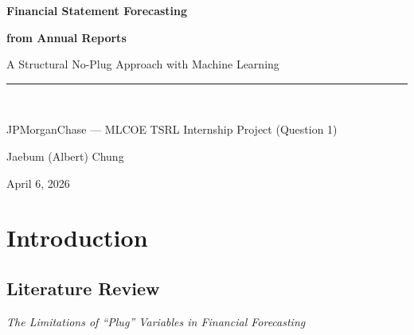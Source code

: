 \documentclass[12pt,a4paper]{article}
\begin{document}
\begin{titlepage}
  \centering
  \vspace*{2cm}
  {\Huge\bfseries\color{jpblue} Financial Statement Forecasting\par}
  \vspace{0.3cm}
  {\Huge\bfseries\color{jpblue} from Annual Reports\par}
  \vspace{0.5cm}
  {\large\color{codegray} A Structural No-Plug Approach with Machine Learning\par}
  \vspace{2cm}
  \rule{0.6\textwidth}{0.4pt}\\[0.5cm]
  {\large JPMorganChase --- MLCOE TSRL Internship Project (Question 1)\par}
  \vspace{0.5cm}
  {\normalsize Jaebum (Albert) Chung\par}
  \vspace{0.3cm}
  {\normalsize April 6, 2026\par}
  \vspace{3cm}
  \begin{abstract}
    \noindent This report implements a structural financial statement forecasting model
    based on the no-plug framework of \hyperlink{ref:pareja09}{Pareja(09)}, where the balance sheet is derived
    endogenously from the cash budget and income statement without circular references.
    Policy variables are trained from historical data using gradient-based optimisation,
    and Bayesian extensions provide confidence intervals via Monte Carlo simulation.
    The framework is extended with LLM-based extraction pipelines for automated
    ingestion of annual reports and strategic financial analysis.
  \end{abstract}
\end{titlepage}

\tableofcontents
\newpage

\section{Introduction}

\subsection{Literature Review}

\emph{The Limitations of ``Plug'' Variables in Financial Forecasting}
\end{document}
